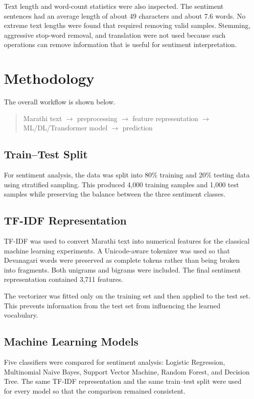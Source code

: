 \documentclass[11pt]{article}
\begin{document}
Text length and word-count statistics were also inspected. The sentiment sentences had an average length of about 49 characters and about 7.6 words. No extreme text lengths were found that required removing valid samples. Stemming, aggressive stop-word removal, and translation were not used because such operations can remove information that is useful for sentiment interpretation.

\section{Methodology}
The overall workflow is shown below.

\begin{quote}
Marathi text $\rightarrow$ preprocessing $\rightarrow$ feature representation $\rightarrow$ ML/DL/Transformer model $\rightarrow$ prediction
\end{quote}

\subsection{Train--Test Split}
For sentiment analysis, the data was split into 80\% training and 20\% testing data using stratified sampling. This produced 4,000 training samples and 1,000 test samples while preserving the balance between the three sentiment classes.

\subsection{TF-IDF Representation}
TF-IDF was used to convert Marathi text into numerical features for the classical machine learning experiments. A Unicode-aware tokenizer was used so that Devanagari words were preserved as complete tokens rather than being broken into fragments. Both unigrams and bigrams were included. The final sentiment representation contained 3,711 features.

The vectorizer was fitted only on the training set and then applied to the test set. This prevents information from the test set from influencing the learned vocabulary.

\subsection{Machine Learning Models}
Five classifiers were compared for sentiment analysis: Logistic Regression, Multinomial Naive Bayes, Support Vector Machine, Random Forest, and Decision Tree. The same TF-IDF representation and the same train--test split were used for every model so that the comparison remained consistent.
\end{document}
